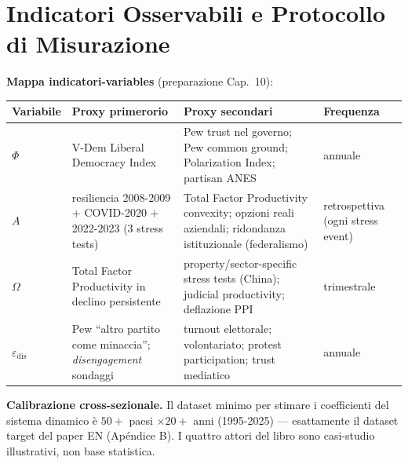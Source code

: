 \section{Indicatori Osservabili e Protocollo di
Misurazione}\label{indicatori-osservabili-e-protocollo-di-medición}

\Proved{} \textbf{Mappa indicatori-variables} (preparazione Cap.~10):

{\def\LTcaptype{none} %
{\small\begin{longtable}[]{@{}
  >{\raggedright\arraybackslash}p{}
  >{\raggedright\arraybackslash}p{}
  >{\raggedright\arraybackslash}p{}
  >{\raggedright\arraybackslash}p{}@{}}
\toprule\noalign{}
\begin{minipage}[b]{\linewidth}\raggedright
Variabile
\end{minipage} & \begin{minipage}[b]{\linewidth}\raggedright
Proxy primerorio
\end{minipage} & \begin{minipage}[b]{\linewidth}\raggedright
Proxy secondari
\end{minipage} & \begin{minipage}[b]{\linewidth}\raggedright
Frequenza
\end{minipage} \\
\midrule\noalign{}
\endhead
\bottomrule\noalign{}
\endlastfoot
\(\Phi\) & V-Dem Liberal Democracy Index & Pew trust nel governo; Pew
common ground; Polarization Index; partisan ANES & annuale \\
\(A\) & resiliencia 2008-2009 + COVID-2020 + 2022-2023 (3 stress tests) &
Total Factor Productivity convexity; opzioni reali aziendali; ridondanza
istituzionale (federalismo) & retrospettiva (ogni stress event) \\
\(\Omega\) & Total Factor Productivity in declino persistente &
property/sector-specific stress tests (China); judicial productivity;
deflazione PPI & trimestrale \\
\(\varepsilon_{\text{dis}}\) & Pew ``altro partito come minaccia'';
\emph{disengagement} sondaggi & turnout elettorale; volontariato;
protest participation; trust mediatico & annuale \\
\end{longtable}}
}

\Hypoth{} \textbf{Calibrazione cross-sezionale.} Il dataset minimo per
stimare i coefficienti del sistema dinamico è \(50+\) paesi
\(\times 20+\) anni (1995-2025) --- esattamente il dataset target del
paper EN (Apéndice B). I quattro attori del libro sono casi-studio
illustrativi, non base statistica.

